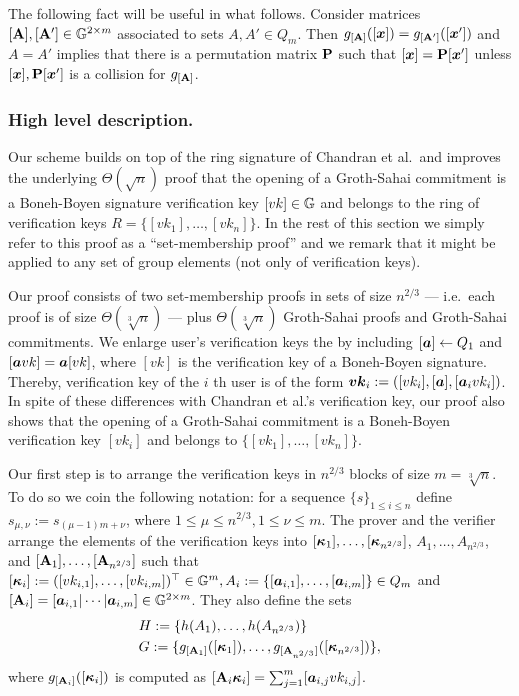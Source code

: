 The following fact will be useful in what follows. Consider matrices $[\mathbf{{A}}],[\mathbf{{A}}']\in\mathbb{G}^{2\times m}$ associated to sets $A,A'\in Q_m$. Then $g_{[\mathbf{{A}}]}([{\boldsymbol{x}}]) = g_{[\mathbf{{A}}']}([{\boldsymbol{x}}'])$ and $A=A'$ implies that there is a permutation matrix $\mathbf{{P}}$ such that $[{\boldsymbol{x}}]=\mathbf{{P}}[{\boldsymbol{x}}']$ unless $[{\boldsymbol{x}}],\mathbf{{P}}[{\boldsymbol{x}}']$ is a collision for $g_{[\mathbf{{A}}]}$.

\subsubsection{High level description.}
Our scheme builds on top of the ring signature of Chandran et al.~and improves the underlying $\Theta(\sqrt{n})$ proof that the opening of a Groth-Sahai commitment is a Boneh-Boyen signature verification key $[vk]\in\mathbb{G}$ and belongs to the ring of verification keys $R=\{[vk_1],\ldots,[vk_n]\}$. In the rest of this section we simply refer to this proof as a ``set-membership proof'' and we remark that it might be applied to any set of group elements (not only of verification keys).

Our proof consists of two set-membership proofs in sets of size $n^{2/3}$ --- i.e.~each proof is of size $\Theta(\sqrt[3]{n})$ ---  plus $\Theta(\sqrt[3]{n})$ Groth-Sahai proofs and Groth-Sahai commitments.
We enlarge user's verification keys the by including $[{\boldsymbol{a}}]\gets Q_1$ and $[{\boldsymbol{a}}vk]={\boldsymbol{a}}[vk]$, where $[vk]$ is the verification key of a Boneh-Boyen signature. Thereby, verification key of the $i$ th user is of the form ${\boldsymbol{vk}}_i:=([vk_i],[{\boldsymbol{a}}],[{\boldsymbol{a}}_ivk_i])$. In spite of these differences with Chandran et al.'s verification key, our proof also shows that the opening of a Groth-Sahai commitment is a Boneh-Boyen verification key $[vk_i]$ and belongs to $\{[vk_1],\ldots,[vk_n]\}$.

Our first step is to arrange the verification keys in $n^{2/3}$ blocks of size $m=\sqrt[3]{n}$. To do so we coin the following notation: for a sequence $\{s\}_{1\leq i \leq n}$ define $s_{\mu,\nu}:=s_{(\mu-1)m+\nu}$, where  $1\leq\mu\leq n^{2/3},1\leq \nu\leq m$.  The prover and the verifier arrange the elements of the verification keys into $[{\boldsymbol{\kappa}}_1],\ldots, [{\boldsymbol{\kappa}}_{n^{2/3}}]$, $A_1,\ldots, A_{n^{2/3}}$, and $[\mathbf{{A}}_1],\ldots, [\mathbf{{A}}_{n^{2/3}}]$ such that $[{\boldsymbol{\kappa}}_i]:= ([vk_{i,1}],\ldots,[vk_{i,m}])^\top\in\mathbb{G}^m, A_i:=\{[{\boldsymbol{a}}_{i,1}],\ldots,[{\boldsymbol{a}}_{i,m}]\}\in Q_m$ and $[\mathbf{{A}}_i]=[{\boldsymbol{a}}_{i,1}|\cdots|{\boldsymbol{a}}_{i,m}]\in\mathbb{G}^{2\times m}$. They also define the sets
\begin{align*}
&H:=\{h(A_1),\ldots,\allowbreak h(A_{n^{2/3}})\}\\
&G:=\{g_{[\mathbf{{A}}_1]}([{\boldsymbol{\kappa}}_1]),\allowbreak\ldots,g_{[\mathbf{{A}}_{n^{2/3}}]}([{\boldsymbol{\kappa}}_{n^{2/3}}])\},
\end{align*}
where $g_{[\mathbf{{A}}_i]}([{\boldsymbol{\kappa}}_i])$ is computed as $[\mathbf{{A}}_i{\boldsymbol{\kappa}}_i]=\sum_{j=1}^m [{\boldsymbol{a}}_{i,j}vk_{i,j}]$.

